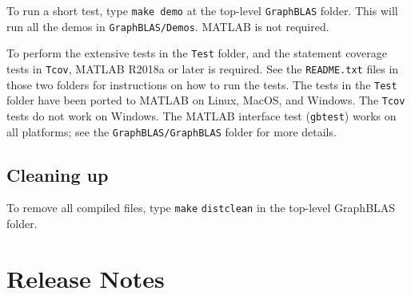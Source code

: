 \documentclass[12pt]{article}
\begin{document}
To run a short test, type \verb'make demo' at the top-level \verb'GraphBLAS'
folder.  This will run all the demos in \verb'GraphBLAS/Demos'.  MATLAB is not
required.

To perform the extensive tests in the \verb'Test' folder, and the statement
coverage tests in \verb'Tcov', MATLAB R2018a or later is required.  See the
\verb'README.txt' files in those two folders for instructions on how to run the
tests.  The tests in the \verb'Test' folder have been ported to MATLAB on
Linux, MacOS, and Windows.  The \verb'Tcov' tests do not work on Windows.  The
MATLAB interface test (\verb'gbtest') works on all platforms; see the
\verb'GraphBLAS/GraphBLAS' folder for more details.

\subsection{Cleaning up}

To remove all compiled files, type \verb'make' \verb'distclean' in the top-level
GraphBLAS folder.

\section{Release Notes}
\end{document}
